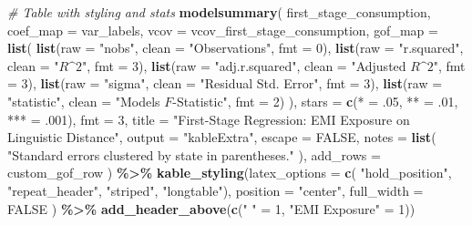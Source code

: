 \documentclass[
]{article}
\newenvironment{Shaded}{\begin{snugshade}}{\end{snugshade}}
\newcommand{\AttributeTok}[1]{\textcolor[rgb]{0.13,0.29,0.53}{#1}}
\newcommand{\CommentTok}[1]{\textcolor[rgb]{0.56,0.35,0.01}{\textit{#1}}}
\newcommand{\ConstantTok}[1]{\textcolor[rgb]{0.56,0.35,0.01}{#1}}
\newcommand{\DecValTok}[1]{\textcolor[rgb]{0.00,0.00,0.81}{#1}}
\newcommand{\FunctionTok}[1]{\textcolor[rgb]{0.13,0.29,0.53}{\textbf{#1}}}
\newcommand{\NormalTok}[1]{#1}
\newcommand{\OtherTok}[1]{\textcolor[rgb]{0.56,0.35,0.01}{#1}}
\newcommand{\SpecialCharTok}[1]{\textcolor[rgb]{0.81,0.36,0.00}{\textbf{#1}}}
\newcommand{\StringTok}[1]{\textcolor[rgb]{0.31,0.60,0.02}{#1}}
\begin{document}
\begin{Shaded}
\begin{Highlighting}[]
\CommentTok{\# Table with styling and stats}
\FunctionTok{modelsummary}\NormalTok{(}
\NormalTok{  first\_stage\_consumption,}
  \AttributeTok{coef\_map =}\NormalTok{ var\_labels,}
  \AttributeTok{vcov =}\NormalTok{ vcov\_first\_stage\_consumption,}
  \AttributeTok{gof\_map =} \FunctionTok{list}\NormalTok{(}
    \FunctionTok{list}\NormalTok{(}\AttributeTok{raw =} \StringTok{"nobs"}\NormalTok{, }\AttributeTok{clean =} \StringTok{"Observations"}\NormalTok{, }\AttributeTok{fmt =} \DecValTok{0}\NormalTok{),}
    \FunctionTok{list}\NormalTok{(}\AttributeTok{raw =} \StringTok{"r.squared"}\NormalTok{, }\AttributeTok{clean =} \StringTok{"$R\^{}2$"}\NormalTok{, }\AttributeTok{fmt =} \DecValTok{3}\NormalTok{),}
    \FunctionTok{list}\NormalTok{(}\AttributeTok{raw =} \StringTok{"adj.r.squared"}\NormalTok{, }\AttributeTok{clean =} \StringTok{"Adjusted $R\^{}2$"}\NormalTok{, }\AttributeTok{fmt =} \DecValTok{3}\NormalTok{),}
    \FunctionTok{list}\NormalTok{(}\AttributeTok{raw =} \StringTok{"sigma"}\NormalTok{, }\AttributeTok{clean =} \StringTok{"Residual Std. Error"}\NormalTok{,  }\AttributeTok{fmt =} \DecValTok{3}\NormalTok{),}
    \FunctionTok{list}\NormalTok{(}\AttributeTok{raw =} \StringTok{"statistic"}\NormalTok{, }\AttributeTok{clean =} \StringTok{"Model\textquotesingle{}s $F${-}Statistic"}\NormalTok{, }\AttributeTok{fmt =} \DecValTok{2}\NormalTok{)}
\NormalTok{  ),}
  \AttributeTok{stars =} \FunctionTok{c}\NormalTok{(}\StringTok{\textquotesingle{}*\textquotesingle{}} \OtherTok{=}\NormalTok{ .}\DecValTok{05}\NormalTok{, }\StringTok{\textquotesingle{}**\textquotesingle{}} \OtherTok{=}\NormalTok{ .}\DecValTok{01}\NormalTok{, }\StringTok{\textquotesingle{}***\textquotesingle{}} \OtherTok{=}\NormalTok{ .}\DecValTok{001}\NormalTok{),}
  \AttributeTok{fmt =} \DecValTok{3}\NormalTok{,}
  \AttributeTok{title =} \StringTok{"First{-}Stage Regression: EMI Exposure on Linguistic Distance"}\NormalTok{,}
  \AttributeTok{output =} \StringTok{"kableExtra"}\NormalTok{,}
  \AttributeTok{escape =} \ConstantTok{FALSE}\NormalTok{,}
  \AttributeTok{notes =} \FunctionTok{list}\NormalTok{(}
    \StringTok{"Standard errors clustered by state in parentheses."}
\NormalTok{  ),}
  \AttributeTok{add\_rows =}\NormalTok{ custom\_gof\_row}
\NormalTok{) }\SpecialCharTok{\%\textgreater{}\%}
  \FunctionTok{kable\_styling}\NormalTok{(}\AttributeTok{latex\_options =} \FunctionTok{c}\NormalTok{(}
    \StringTok{"hold\_position"}\NormalTok{, }
    \StringTok{"repeat\_header"}\NormalTok{, }
    \StringTok{"striped"}\NormalTok{,}
    \StringTok{"longtable"}\NormalTok{), }
    \AttributeTok{position =} \StringTok{"center"}\NormalTok{, }
    \AttributeTok{full\_width =} \ConstantTok{FALSE}
\NormalTok{    ) }\SpecialCharTok{\%\textgreater{}\%}
  \FunctionTok{add\_header\_above}\NormalTok{(}\FunctionTok{c}\NormalTok{(}\StringTok{" "} \OtherTok{=} \DecValTok{1}\NormalTok{, }\StringTok{"EMI Exposure"} \OtherTok{=} \DecValTok{1}\NormalTok{))}
\end{Highlighting}
\end{Shaded}
\end{document}
